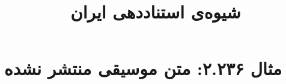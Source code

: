 \documentclass[a4paper,10pt]{article}
\begin{document}
\title{شیوه‌ی استناددهی ایران
 }
\author{}
\date{}
\maketitle



\section*{مثال ۲.۲۳۶: متن موسیقی منتشر نشده}

\cite{نیکمنظر1385}\\
\cite{shapey1966}\\






\end{document}
